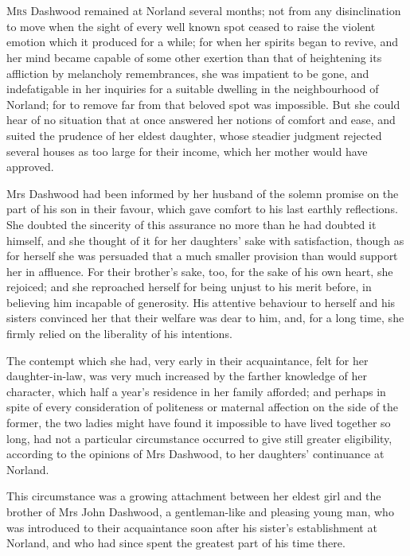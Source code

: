 \chapter[Chapter \thechapter]{}
\lettrine[lines=4,lraise=0.3]{M}{rs} Dashwood remained at Norland several months; not from any disinclination to move when the sight of every well known spot ceased to raise the violent emotion which it produced for a while; for when her spirits began to revive, and her mind became capable of some other exertion than that of heightening its affliction by melancholy remembrances, she was impatient to be gone, and indefatigable in her inquiries for a suitable dwelling in the neighbourhood of Norland; for to remove far from that beloved spot was impossible. But she could hear of no situation that at once answered her notions of comfort and ease, and suited the prudence of her eldest daughter, whose steadier judgment rejected several houses as too large for their income, which her mother would have approved.

Mrs Dashwood had been informed by her husband of the solemn promise on the part of his son in their favour, which gave comfort to his last earthly reflections. She doubted the sincerity of this assurance no more than he had doubted it himself, and she thought of it for her daughters’ sake with satisfaction, though as for herself she was persuaded that a much smaller provision than  would support her in affluence. For their brother’s sake, too, for the sake of his own heart, she rejoiced; and she reproached herself for being unjust to his merit before, in believing him incapable of generosity. His attentive behaviour to herself and his sisters convinced her that their welfare was dear to him, and, for a long time, she firmly relied on the liberality of his intentions.

The contempt which she had, very early in their acquaintance, felt for her daughter-in-law, was very much increased by the farther knowledge of her character, which half a year’s residence in her family afforded; and perhaps in spite of every consideration of politeness or maternal affection on the side of the former, the two ladies might have found it impossible to have lived together so long, had not a particular circumstance occurred to give still greater eligibility, according to the opinions of Mrs Dashwood, to her daughters’ continuance at Norland.

This circumstance was a growing attachment between her eldest girl and the brother of Mrs John Dashwood, a gentleman-like and pleasing young man, who was introduced to their acquaintance soon after his sister’s establishment at Norland, and who had since spent the greatest part of his time there.

